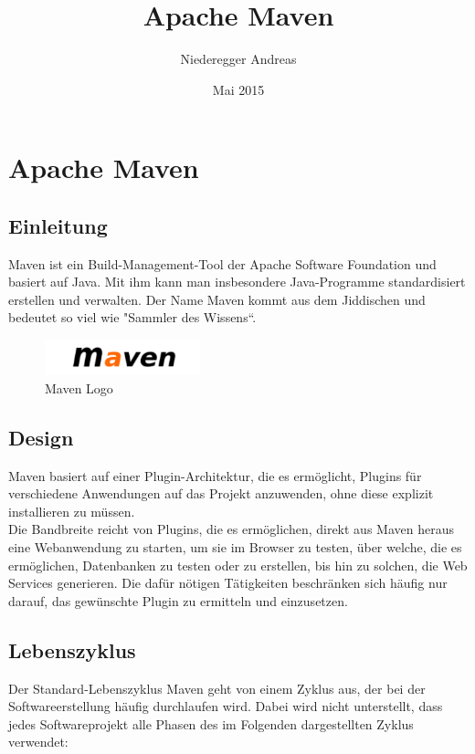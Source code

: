\title{Apache Maven} 
\author{Niederegger Andreas }
\date{Mai 2015}

\maketitle

\section{Apache Maven}
\subsection{Einleitung}
Maven ist ein Build-Management-Tool der Apache Software Foundation und basiert auf Java. Mit ihm kann man insbesondere Java-Programme standardisiert erstellen und verwalten.
Der Name Maven kommt aus dem Jiddischen und bedeutet so viel wie "Sammler des Wissens“.


\begin{figure}[ht]
  \centering
    \includegraphics[width=0.4\textwidth]{MavenLogo}
  \caption{Maven Logo}
  \label{fig:MavenLogo}
\end{figure}


\subsection{Design}
Maven basiert auf einer Plugin-Architektur, die es ermöglicht, Plugins für verschiedene Anwendungen auf das Projekt anzuwenden, ohne diese explizit installieren zu müssen. 
\\Die Bandbreite reicht von Plugins, die es ermöglichen, direkt aus Maven heraus eine Webanwendung zu starten, um sie im Browser zu testen, über welche, die es ermöglichen, Datenbanken zu testen oder zu erstellen, bis hin zu solchen, die Web Services generieren. Die dafür nötigen Tätigkeiten beschränken sich häufig nur darauf, das gewünschte Plugin zu ermitteln und einzusetzen.
\newpage
\subsection{Lebenszyklus}
Der Standard-Lebenszyklus
Maven geht von einem Zyklus aus, der bei der Softwareerstellung häufig durchlaufen wird. Dabei wird nicht unterstellt, dass jedes Softwareprojekt alle Phasen des im Folgenden dargestellten Zyklus verwendet:

